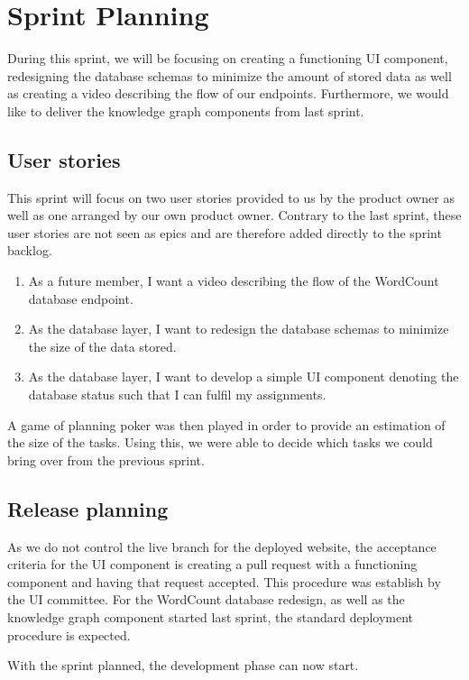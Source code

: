 \section{Sprint Planning}
During this sprint, we will be focusing on creating a functioning UI component, redesigning the database schemas to minimize the amount of stored data as well as creating a video describing the flow of our endpoints. Furthermore, we would like to deliver the knowledge graph components from last sprint. 

\subsection*{User stories}
This sprint will focus on two user stories provided to us by the \knox{} product owner as well as one arranged by our own product owner. 
Contrary to the last sprint, these user stories are not seen as epics and are therefore added directly to the sprint backlog. 

\begin{enumerate}
    \item As a future \knox{} member, I want a video describing the flow of the WordCount database endpoint. 
    \item As the database layer, I want to redesign the database schemas to minimize the size of the data stored. 
    \item As the database layer, I want to develop a simple UI component denoting the database status such that I can fulfil my \knox{} assignments. 
\end{enumerate}

A game of planning poker was then played in order to provide an estimation of the size of the tasks. 
Using this, we were able to decide which tasks we could bring over from the previous sprint.

\subsection*{Release planning}
As we do not control the live branch for the deployed \knox{} website, the acceptance criteria for the UI component is creating a pull request with a functioning component and having that request accepted.
This procedure was establish by the UI committee. 
For the WordCount database redesign, as well as the knowledge graph component started last sprint, the standard deployment procedure is expected. 

With the sprint planned, the development phase can now start.
